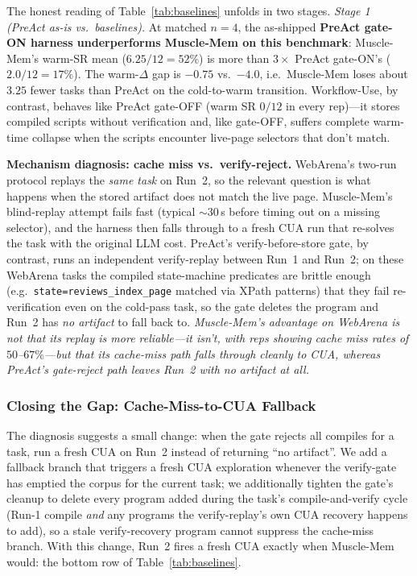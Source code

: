 \documentclass[11pt]{article}
\begin{document}
The honest reading of Table~\ref{tab:baselines} unfolds in two stages. \emph{Stage 1 (PreAct as-is vs.\ baselines).} At matched $n{=}4$, the as-shipped \textbf{PreAct gate-ON harness underperforms Muscle-Mem on this benchmark}: Muscle-Mem's warm-SR mean ($6.25/12 = 52\%$) is more than $3\times$ PreAct gate-ON's ($2.0/12 = 17\%$). The warm-$\Delta$ gap is $-0.75$ vs.\ $-4.0$, i.e.\ Muscle-Mem loses about $3.25$ fewer tasks than PreAct on the cold-to-warm transition. Workflow-Use, by contrast, behaves like PreAct gate-OFF (warm SR $0/12$ in every rep)---it stores compiled scripts without verification and, like gate-OFF, suffers complete warm-time collapse when the scripts encounter live-page selectors that don't match.

\textbf{Mechanism diagnosis: cache miss vs.\ verify-reject.} WebArena's two-run protocol replays the \emph{same task} on Run~2, so the relevant question is what happens when the stored artifact does not match the live page. Muscle-Mem's blind-replay attempt fails fast (typical $\sim 30$\,s before timing out on a missing selector), and the harness then falls through to a fresh CUA run that re-solves the task with the original LLM cost. PreAct's verify-before-store gate, by contrast, runs an independent verify-replay between Run~1 and Run~2; on these WebArena tasks the compiled state-machine predicates are brittle enough (e.g.\ \texttt{state=reviews\_index\_page} matched via XPath patterns) that they fail re-verification even on the cold-pass task, so the gate deletes the program and Run~2 has \emph{no artifact} to fall back to. \emph{Muscle-Mem's advantage on WebArena is not that its replay is more reliable---it isn't, with reps showing cache miss rates of $50$--$67\%$---but that its cache-miss path falls through cleanly to CUA, whereas PreAct's gate-reject path leaves Run~2 with no artifact at all.}

\subsubsection{Closing the Gap: Cache-Miss-to-CUA Fallback}
\label{sec:eval-baselines-fallback}

The diagnosis suggests a small change: when the gate rejects all compiles for a task, run a fresh CUA on Run~2 instead of returning ``no artifact''. We add a fallback branch that triggers a fresh CUA exploration whenever the verify-gate has emptied the corpus for the current task; we additionally tighten the gate's cleanup to delete every program added during the task's compile-and-verify cycle (Run-1 compile \emph{and} any programs the verify-replay's own CUA recovery happens to add), so a stale verify-recovery program cannot suppress the cache-miss branch. With this change, Run~2 fires a fresh CUA exactly when Muscle-Mem would: the bottom row of Table~\ref{tab:baselines}.
\end{document}
